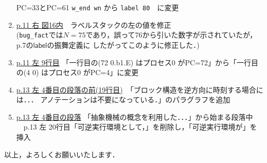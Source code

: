 \documentclass{jarticle}
\newcommand{\bcode}[1]{$\mathsf{#1}$}
\begin{document}
\begin{enumerate}
          PC=33とPC=61  \texttt{w\_end wn} から  \texttt{label 80}　に変更
\item \underline{p.11 右 図16内}　ラベルスタックの左の値を修正\\
(\texttt{bug\_fact}では$N=75$であり，誤って76から引いた数字が示されていたが，p.7の\bcode{label}の振舞定義に
したがってこのように修正した．)
\item \underline{p.11 左 9行目} 「一行目の(72 0.b1.E) はプロセス0 がPC=72」から「一行目の(4 0) はプロセス0 がPC=4」に変更
\item \underline{p.13 左 4番目の段落の前(19行目)}　「ブロック構造を逆方向に時刻する場合には．．．
アノテーションは不要になっている．」のパラグラフを追加
\item \underline{p.13 左 4番目の段落} 「抽象機械の概念を利用した．．．」から始まる段落中\\
　p.13 左 20行目「可逆実行環境として，」を削除し，「可逆実行環境が」を挿入
\end{enumerate}

以上，よろしくお願いいたします．
\end{document}
